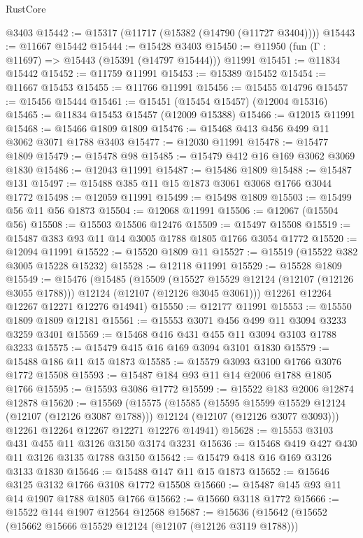 \begin{lexlean}{RustCore}
\begin{coremodule}
    @3403
@15442 := @15317 (@11717 (@15382 (@14790 (@11727 @3404))))
@15443 := @11667 @15442
@15444 := @15428 @3403
@15450 := @11950 (fun (Γ : @11697) => @15443 (@15391 (@14797 @15444))) @11991
@15451 := @11834 @15442
@15452 := @11759 @11991
@15453 := @15389 @15452
@15454 := @11667 @15453
@15455 := @11766 @11991
@15456 := @15455 @14796
@15457 := @15456 @15444
@15461 := @15451 (@15454 @15457) (@12004 @15316)
@15465 := @11834 @15453 @15457 (@12009 @15388)
@15466 := @12015 @11991
@15468 := @15466 @1809 @1809
@15476 := @15468 @413 @456 @499 @11 @3062 @3071 @1788 @3403
@15477 := @12030 @11991
@15478 := @15477 @1809
@15479 := @15478 @98
@15485 := @15479 @412 @16 @169 @3062 @3069 @1830
@15486 := @12043 @11991
@15487 := @15486 @1809
@15488 := @15487 @131
@15497 := @15488 @385 @11 @15 @1873 @3061 @3068 @1766 @3044 @1772
@15498 := @12059 @11991
@15499 := @15498 @1809
@15503 := @15499 @56 @11 @56 @1873
@15504 := @12068 @11991
@15506 := @12067 (@15504 @56)
@15508 := @15503 @15506 @12476
@15509 := @15497 @15508
@15519 := @15487 @383 @93 @11 @14 @3005 @1788 @1805 @1766 @3054 @1772
@15520 := @12094 @11991
@15522 := @15520 @1809 @11
@15527 := @15519 (@15522 @382 @3005 @15228 @15232)
@15528 := @12118 @11991
@15529 := @15528 @1809
@15549 := @15476
    (@15485
      (@15509
        (@15527 @15529 @12124 (@12107 (@12126 @3055 @1788)))
        @12124
        (@12107 (@12126 @3045 @3061)))
      @12261
      @12264
      @12267
      @12271
      @12276
      @14941)
@15550 := @12177 @11991
@15553 := @15550 @1809 @1809 @12181
@15561 := @15553 @3071 @456 @499 @11 @3094 @3233 @3259 @3401
@15569 := @15468 @416 @431 @455 @11 @3094 @3103 @1788 @3233
@15575 := @15479 @415 @16 @169 @3094 @3101 @1830
@15579 := @15488 @186 @11 @15 @1873
@15585 := @15579 @3093 @3100 @1766 @3076 @1772 @15508
@15593 := @15487 @184 @93 @11 @14 @2006 @1788 @1805 @1766
@15595 := @15593 @3086 @1772
@15599 := @15522 @183 @2006 @12874 @12878
@15620 := @15569
    (@15575
      (@15585
        (@15595 @15599 @15529 @12124 (@12107 (@12126 @3087 @1788)))
        @12124
        (@12107 (@12126 @3077 @3093)))
      @12261
      @12264
      @12267
      @12271
      @12276
      @14941)
@15628 := @15553 @3103 @431 @455 @11 @3126 @3150 @3174 @3231
@15636 := @15468 @419 @427 @430 @11 @3126 @3135 @1788 @3150
@15642 := @15479 @418 @16 @169 @3126 @3133 @1830
@15646 := @15488 @147 @11 @15 @1873
@15652 := @15646 @3125 @3132 @1766 @3108 @1772 @15508
@15660 := @15487 @145 @93 @11 @14 @1907 @1788 @1805 @1766
@15662 := @15660 @3118 @1772
@15666 := @15522 @144 @1907 @12564 @12568
@15687 := @15636
    (@15642
      (@15652
        (@15662 @15666 @15529 @12124 (@12107 (@12126 @3119 @1788)))

\end{coremodule}
\end{lexlean}
